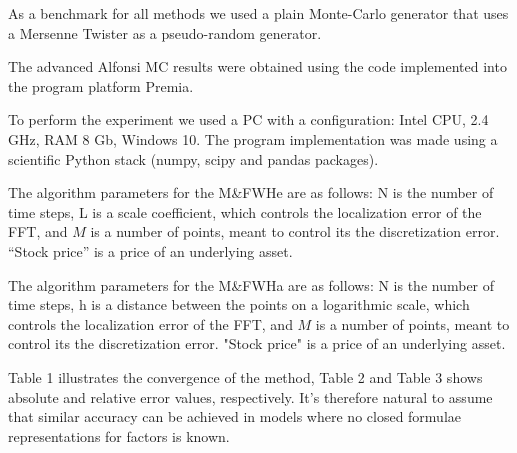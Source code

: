 \documentclass[a4paper]{jpconf}
\begin{document}
As a benchmark for all methods we used a plain Monte-Carlo generator that uses a Mersenne Twister as a pseudo-random generator. 

The advanced Alfonsi \cite{alfonsi} MC results were obtained using the code implemented into the program platform Premia.

To perform the experiment we used a PC with a configuration: Intel CPU, 2.4 GHz, RAM 8 Gb, Windows 10. The program implementation was made using a scientific Python stack (numpy, scipy and pandas packages).

The algorithm parameters for the M\&FWHe are as follows: N is the number of time steps, L is a scale coefficient, which controls the localization error of the FFT, and $M$ is a number of points, meant to control its the discretization error. ``Stock price'' is a price of an underlying asset.

The algorithm parameters for the M\&FWHa are as follows: N is the number of time steps, h is a distance between the points on a logarithmic scale, which controls the localization error of the FFT, and $M$ is a number of points, meant to control its the discretization error. "Stock price" is a price of an underlying asset.

Table 1 illustrates the convergence of the method, Table 2 and Table 3 shows absolute and relative error values, respectively. It's therefore natural to assume that similar accuracy can be achieved in models where no closed formulae representations for factors is known.
\end{document}
